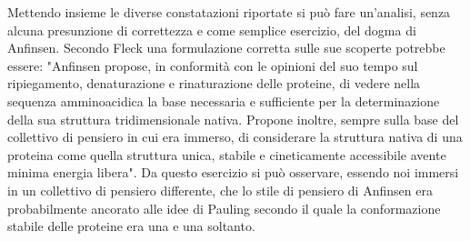 {Mettendo insieme le diverse constatazioni riportate si può fare un'analisi, senza alcuna presunzione di correttezza e come semplice esercizio, del dogma di Anfinsen. Secondo Fleck una formulazione corretta sulle sue scoperte potrebbe essere: "Anfinsen propose, in conformità con le opinioni del suo tempo sul ripiegamento, denaturazione e rinaturazione delle proteine, di vedere nella sequenza amminoacidica la base necessaria e sufficiente per la determinazione della sua struttura tridimensionale nativa. Propone inoltre, sempre sulla base del collettivo di pensiero in cui era immerso, di considerare la struttura nativa di una proteina come quella struttura unica, stabile e cineticamente accessibile avente minima energia libera". Da questo esercizio si può osservare, essendo noi immersi in un collettivo di pensiero differente, che lo stile di pensiero di Anfinsen era probabilmente ancorato alle idee di Pauling secondo il quale la conformazione stabile delle proteine era una e una soltanto.
}

